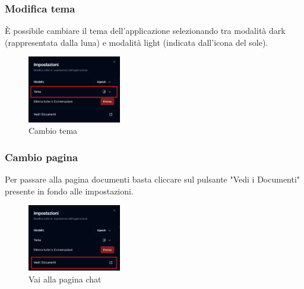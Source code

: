 \newpage
\subsubsection{Modifica tema}
È possibile cambiare il tema dell'applicazione selezionando tra modalità dark (rappresentata dalla luna) e modalità light (indicata dall'icona del sole).
\begin{figure}[h!]
    \centering
    \includegraphics[width=0.364\textwidth]{settingchattheme.png}
    \caption{Cambio tema}\label{fig:settingchattheme}
\end{figure}
\subsubsection{Cambio pagina}
Per passare alla pagina documenti basta cliccare sul pulsante "Vedi i Documenti" presente in fondo alle impostazioni.
\begin{figure}[h!]
    \centering
    \includegraphics[width=0.364\textwidth]{settingchatchange.png}
    \caption{Vai alla pagina chat}\label{fig:changepage}
\end{figure}
